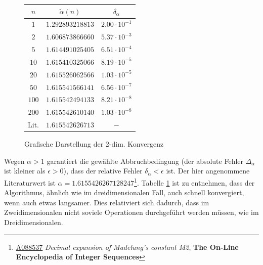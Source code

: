 \documentclass[10pt,a4paper]{article}
\begin{document}
\vspace{-10pt}
\begin{figure}[h]
\begin{minipage}[c]{0.5\textwidth}
\captionsetup{type=figure}
\begin{center}

\caption{Grafische Darstellung der 2-dim. Konvergenz}
\label{plotkonvergenz2d}
\end{center}
\end{minipage}
\begin{minipage}[c]{0.5\textwidth}
\captionsetup{type=table}
\begin{center}
\begin{tabular}{c|c|c}
\rule[-1ex]{0pt}{2.5ex} $n$ & $\tilde{\alpha}(n)$ & $\delta_\alpha$ \\ 
\hline 
\rule[-1ex]{0pt}{2.5ex} $1$ & $1.292893218813$ & $2.00\cdot10^{-1}$ \\ 
\hline 
\rule[-1ex]{0pt}{2.5ex} $2$ & $1.606873866660$ & $5.37\cdot10^{-3}$ \\ 
\hline
\rule[-1ex]{0pt}{2.5ex} $5$ & $1.614491025405$ & $6.51\cdot10^{-4}$ \\ 
\hline 
\rule[-1ex]{0pt}{2.5ex} $10$ & $1.615410325066$ & $8.19\cdot10^{-5}$ \\ 
\hline 
\rule[-1ex]{0pt}{2.5ex} $20$ & $1.615526062566$ & $1.03\cdot10^{-5}$ \\ 
\hline 
\rule[-1ex]{0pt}{2.5ex} $50$ & $1.615541566141$ & $6.56\cdot10^{-7}$ \\
\hline
\rule[-1ex]{0pt}{2.5ex} $100$ & $1.615542494133$ & $8.21\cdot10^{-8}$ \\ 
\hline
\rule[-1ex]{0pt}{2.5ex} $200$ & $1.615542610140$ & $1.03\cdot10^{-8}$ \\ 
\hline
\rule[1ex]{0pt}{2.5ex} Lit.   & $1.615542626713$ & $ - $
\end{tabular}
\label{tab:konvergenz2d}
\end{center}
\end{minipage}
\end{figure}
Wegen $\alpha > 1$ garantiert die gewählte Abbruchbedingung (der absolute Fehler $\Delta_\alpha$ ist kleiner als $\epsilon > 0$), 
dass der relative Fehler $\delta_\alpha < \epsilon$ ist. Der hier angenommene Literaturwert ist $\alpha = 1.6155426267128247$\footnote{\href{https://oeis.org/A088537}{A088537} \emph{Decimal expansion of Madelung's constant M2}, \textbf{The On-Line Encyclopedia of Integer Sequences}}. Tabelle \ref{tab:konvergenz2d} ist zu entnehmen, dass der Algorithmus, ähnlich wie im dreidimensionalen Fall, auch schnell konvergiert, wenn auch etwas langsamer. Dies relativiert sich dadurch, dass im Zweidimensionalen
nicht soviele Operationen durchgeführt werden müssen, wie im Dreidimensionalen.
\end{document}

